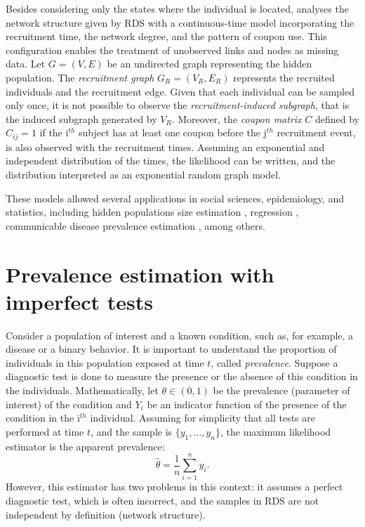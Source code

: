 Besides considering only the states where the individual is located,
\cite{crawford2016} analyses the network structure given by RDS with a
continuous-time model incorporating the recruitment time, the network degree,
and the pattern of coupon use. This configuration enables the treatment of
unobserved links and nodes as missing data. Let $G = (V,E)$ be an undirected
graph representing the hidden population. The {\em recruitment graph} $G_R =
(V_R, E_R)$ represents the recruited individuals and the recruitment edge.
Given that each individual can be sampled only once, it is not possible to
observe the {\em recruitment-induced subgraph}, that is the induced subgraph
generated by $V_R$. Moreover, the {\em coupon matrix} $C$ defined by $C_{ij} =
1$ if the i$^{th}$ subject has at least one coupon before the j$^{th}$
recruitment event, is also observed with the recruitment times. Assuming an
exponential and independent distribution of the times, the likelihood can be
written, and the distribution interpreted as an exponential random graph
model. 

These models allowed several applications in social sciences, epidemiology,
and statistics, including hidden populations size estimation
\cite{crawford2018hidden}, regression \cite{bastos2012binary}, communicable
disease prevalence estimation \cite{albuquerque2009avaliaccao}, among others. 

\section{Prevalence estimation with imperfect tests}

Consider a population of interest and a known condition, such as, for example,
a disease or a binary behavior. It is important to understand the proportion
of individuals in this population exposed at time $t$, called {\em
prevalence}. Suppose a diagnostic test is done to measure the presence or the
absence of this condition in the individuals. Mathematically, let $\theta \in
(0,1)$ be the prevalence (parameter of interest) of the condition and $Y_i$ be an indicator function of the presence of the condition in the i$^{th}$ individual.
Assuming for simplicity that all tests are performed at time $t$, and the
sample is $\{y_1, ..., y_n\}$, the maximum likelihood estimator is the
apparent prevalence: 
\begin{equation}
    \label{eq:naive-estimator}
    \hat{\theta} = \frac{1}{n}\sum_{i=1}^n y_i.
\end{equation}
However, this estimator has two problems in this context: it assumes a perfect
diagnostic test, which is often incorrect, and the samples in RDS are not
independent by definition (network structure). 

